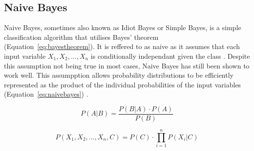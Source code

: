 \documentclass{article}
\begin{document}
\subsection{Naive Bayes}
\label{sec:naivebayes}
Naive Bayes, sometimes also known as Idiot Bayes or Simple Bayes, is a simple classification algorithm
that utilises Bayes' theorem (Equation~\ref{eq:bayestheorem}). It is reffered to as naive
as it assumes that each input variable $X_1, X_2,..., X_n $ is conditionally independant given the class
\cite{lowdNaiveBayesModels2005}. Despite this assumption not being true in most cases, Naive Bayes has
still been shown to work well. This assumpption allows probability distributions to be efficiently represented
as the product of the individual probabilities of the input variables (Equation~\ref{eq:naivebayes}) \cite{lowdNaiveBayesModels2005}.

\begin{equation}
    \label{eq:bayestheorem}
    P(A|B) = \frac{P(B|A) \cdot P(A)}{P(B)}
\end{equation}


\begin{equation}
\label{eq:naivebayes}
P(X_1, X_2, ..., X_n, C) ={P(C)}\cdot \prod_{i=1}^{n}{P(X_i | C)}
\end{equation}





\end{document}
